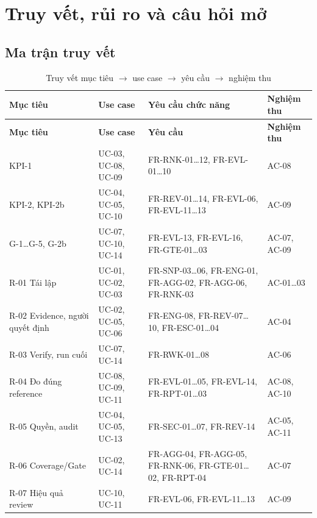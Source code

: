 \chapter{Truy vết, rủi ro và câu hỏi mở}
\label{ch:trace}

\section{Ma trận truy vết}
\label{sec:tracematrix}
\begin{xltabular}{\linewidth}{@{}L{2.2cm}L{2.6cm}Y L{2.4cm}@{}}
\caption{Truy vết mục tiêu $\rightarrow$ use case $\rightarrow$ yêu cầu $\rightarrow$ nghiệm thu}\label{tab:trace}\\
\toprule
\textbf{Mục tiêu} & \textbf{Use case} & \textbf{Yêu cầu chức năng} & \textbf{Nghiệm thu}\\
\midrule
\endfirsthead
\toprule \textbf{Mục tiêu} & \textbf{Use case} & \textbf{Yêu cầu} & \textbf{Nghiệm thu}\\ \midrule
\endhead
\bottomrule
\endfoot
KPI-1 & UC-03, UC-08, UC-09 & FR-RNK-01…12, FR-EVL-01…10 & AC-08\\
KPI-2, KPI-2b & UC-04, UC-05, UC-10 & FR-REV-01…14, FR-EVL-06, FR-EVL-11…13 & AC-09\\
G-1…G-5, G-2b & UC-07, UC-10, UC-14 & FR-EVL-13, FR-EVL-16, FR-GTE-01…03 & AC-07, AC-09\\
R-01 Tái lập & UC-01, UC-02, UC-03 & FR-SNP-03…06, FR-ENG-01, FR-AGG-02, FR-AGG-06, FR-RNK-03 & AC-01…03\\
R-02 Evidence, người quyết định & UC-02, UC-05, UC-06 & FR-ENG-08, FR-REV-07…10, FR-ESC-01…04 & AC-04\\
R-03 Verify, run cuối & UC-07, UC-14 & FR-RWK-01…08 & AC-06\\
R-04 Đo đúng reference & UC-08, UC-09, UC-11 & FR-EVL-01…05, FR-EVL-14, FR-RPT-01…03 & AC-08, AC-10\\
R-05 Quyền, audit & UC-04, UC-05, UC-13 & FR-SEC-01…07, FR-REV-14 & AC-05, AC-11\\
R-06 Coverage/Gate & UC-02, UC-14 & FR-AGG-04, FR-AGG-05, FR-RNK-06, FR-GTE-01…02, FR-RPT-04 & AC-07\\
R-07 Hiệu quả review & UC-10, UC-11 & FR-EVL-06, FR-EVL-11…13 & AC-09\\
\end{xltabular}

